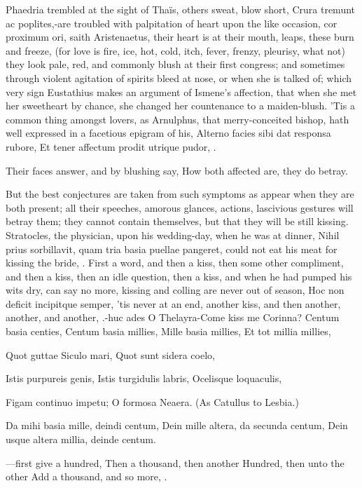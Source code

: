 Phaedria trembled at the sight of Thaïs, others sweat, blow short,
Crura tremunt ac poplites,-are troubled with palpitation of heart upon
the like occasion, cor proximum ori, saith Aristenaetus, their
heart is at their mouth, leaps, these burn and freeze, (for love is
fire, ice, hot, cold, itch, fever, frenzy, pleurisy, what not) they
look pale, red, and commonly blush at their first congress; and
sometimes through violent agitation of spirits bleed at nose, or when
she is talked of; which very sign Eustathius makes an argument of
Ismene's affection, that when she met her sweetheart by chance, she
changed her countenance to a maiden-blush. 'Tis a common thing amongst
lovers, as Arnulphus, that merry-conceited bishop, hath well
expressed in a facetious epigram of his,
Alterno facies sibi dat responsa rubore,
Et tener affectum prodit utrique pudor, \etc{}.

Their faces answer, and by blushing say,
How both affected are, they do betray.

But the best conjectures are taken from such symptoms as appear when
they are both present; all their speeches, amorous glances, actions,
lascivious gestures will betray them; they cannot contain themselves,
but that they will be still kissing. Stratocles, the physician,
upon his wedding-day, when he was at dinner, Nihil prius sorbillavit,
quam tria basia puellae pangeret, could not eat his meat for kissing
the bride, \etc{}. First a word, and then a kiss, then some other
compliment, and then a kiss, then an idle question, then a kiss, and
when he had pumped his wits dry, can say no more, kissing and colling
are never out of season, Hoc non deficit incipitque semper, 'tis
never at an end, another kiss, and then another, another, and
another, \etc{}.-huc ades O Thelayra-Come kiss me Corinna?
Centum basia centies,
Centum basia millies,
Mille basia millies,
Et tot millia millies,

Quot guttae Siculo mari,
Quot sunt sidera coelo,

Istis purpureis genis,
Istis turgidulis labris,
Ocelisque loquaculis,

Figam continuo impetu;
O formosa Neaera. (As Catullus to Lesbia.)

Da mihi basia mille, deindi centum,
Dein mille altera, da secunda centum,
Dein usque altera millia, deinde centum.

---first give a hundred,
Then a thousand, then another
Hundred, then unto the other
Add a thousand, and so more, \etc{}.

